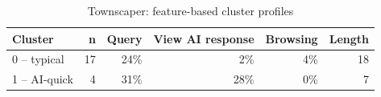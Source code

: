 \begin{table}[t]
\centering
\caption{Townscaper: feature-based cluster profiles}
\label{tab:rq4-townscaper-clusters}
\begin{tabular}{lrrrrr}
\toprule
Cluster & n & Query & View AI response & Browsing & Length \\
\midrule
0 -- typical & 17 & 24\% & 2\% & 4\% & 18 \\
1 -- AI-quick & 4 & 31\% & 28\% & 0\% & 7 \\
\bottomrule
\end{tabular}
\end{table}
